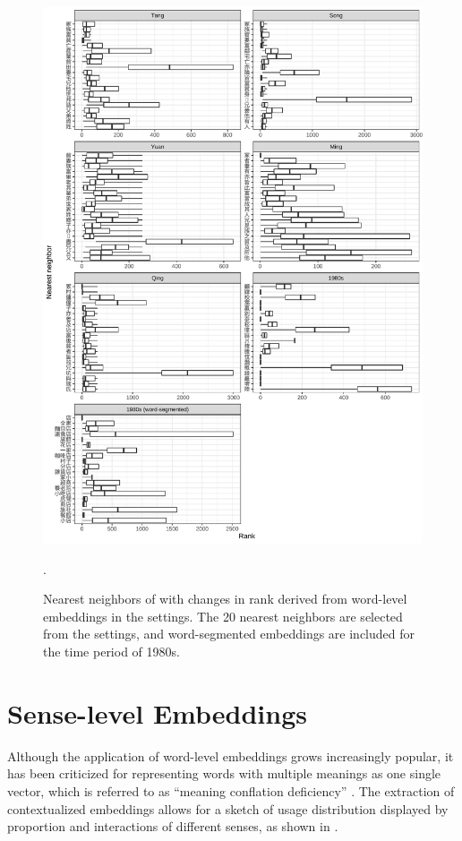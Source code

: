 \newpage
\begin{figure}[H]
  \centering
  \includegraphics[height=0.85\textheight,keepaspectratio]{figures_new/bootstrap_for_stability/neighbor_rank_change.pdf}
  \caption{Nearest neighbors of \jia with changes in rank derived from word-level embeddings in the  settings. The 20 nearest neighbors are selected from the  settings, and word-segmented embeddings are included for the time period of 1980s.} \label{fig:bootstrap_rank}.
\end{figure}

\section{Sense-level Embeddings}
Although the application of word-level embeddings grows increasingly popular, it has been criticized for representing words with multiple meanings as one single vector, which is referred to as ``meaning conflation deficiency'' \parencite{camacho2018survey}. The extraction of contextualized embeddings allows for a sketch of usage distribution displayed by proportion and interactions of different senses, as shown in .

